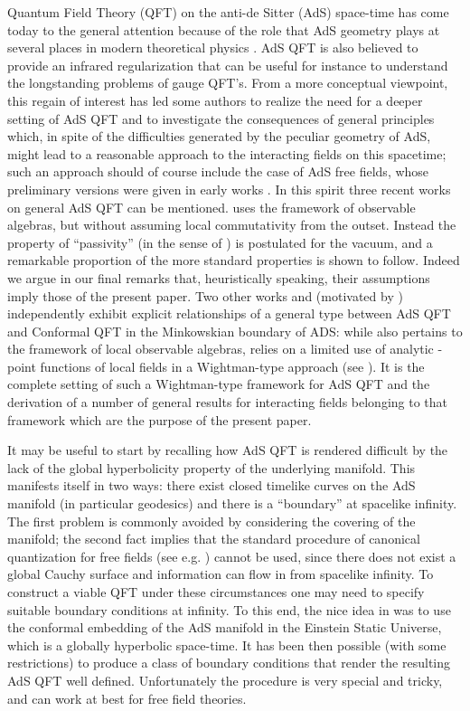 \documentclass[a4paper,a4paper]{article}
\begin{document}
   Quantum Field Theory (QFT) on  the anti-de Sitter (AdS)
space-time has come today to the general attention because of the
role that AdS geometry plays at several places in modern
theoretical physics  \cite{maldacena,RS}. AdS QFT is also
believed to provide an infrared regularization \cite{wilczek}
that can be useful for instance to understand the longstanding
problems of gauge QFT's. From a more conceptual viewpoint,
this regain of interest has led some authors to realize the need
for a deeper setting of AdS QFT and to investigate
the consequences of general principles
which, in spite of the difficulties generated by the
peculiar geometry of AdS,
might lead to a reasonable approach to
the interacting fields on this spacetime;
such an approach should of course include the case of AdS free fields,
whose preliminary versions were
given in early works \cite{Avis} \cite{Fronsdal:1974}.
In this spirit three recent works on general AdS QFT
can be mentioned.
\cite{BFS} uses the framework of observable algebras, but
without assuming local commutativity from the outset. Instead
the property of ``passivity'' (in the sense of \cite{PW})
is postulated for the vacuum, and a remarkable proportion
of the more standard properties is shown to follow.
Indeed we argue in our final remarks that, heuristically
speaking, their assumptions imply those of the present paper.
Two other works \cite{Re} and \cite{BBMS}
(motivated by \cite{maldacena}) independently exhibit explicit relationships
of a general type between AdS QFT and Conformal QFT in the Minkowskian
boundary of ADS: while \cite{Re} also pertains to the
framework of local observable algebras,
\cite{BBMS}
relies on a limited use of analytic \coordHE{}-point functions of local fields
in a Wightman-type approach (see \cite{SW}).
It is the complete setting of such a
Wightman-type framework for AdS QFT
and the derivation of a number of general results
for interacting fields belonging to that framework
which are the purpose of the present paper.

\vskip 0.1cm
It may be useful to start by recalling how AdS QFT is rendered
difficult by the lack of the global hyperbolicity property of the
underlying manifold. This manifests itself in two ways:
there exist closed timelike curves on the AdS manifold (in
particular geodesics) and there is a ``boundary'' at spacelike
infinity. The first problem is commonly avoided by considering
the covering of the manifold; the second fact implies that the
standard procedure of canonical quantization for free fields (see
e.g. \cite{BD,wald}) cannot be used, since there does not exist a
global Cauchy surface and information can flow in from spacelike
infinity.
To construct a viable QFT under these circumstances one may need
to specify suitable boundary conditions at infinity. To this end,
the nice idea in \cite{Avis} was to use the conformal embedding
of the AdS manifold in the Einstein Static Universe, which is a
globally hyperbolic space-time. It has been then possible (with
some restrictions) to produce a class of boundary conditions that
render the resulting AdS QFT well defined. Unfortunately the
procedure is very special and tricky, and can work at best for
free field theories.
\end{document}
